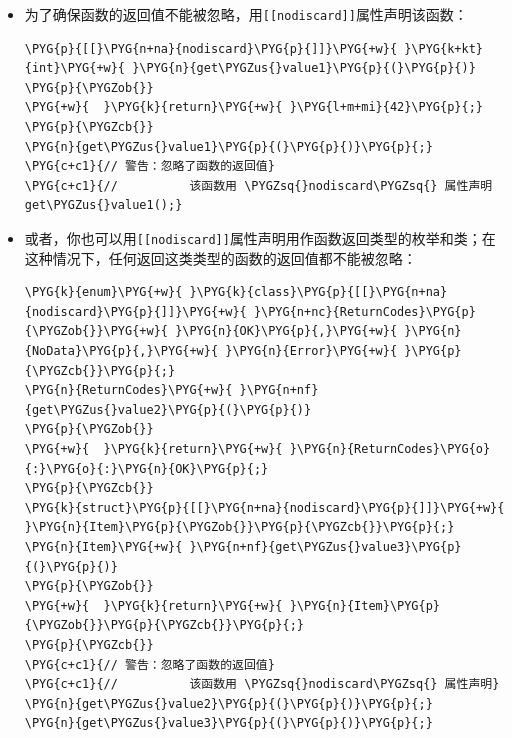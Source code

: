 \begin{itemize}
\item 为了确保函数的返回值不能被忽略，用\texttt{[[nodiscard]]}属性声明该函数：



\begin{codeblockbg}
\begin{Verbatim}[commandchars=\\\{\},breaklines=true,breakanywhere=true,fontsize=\codefont,xleftmargin=17bp]
\PYG{p}{[[}\PYG{n+na}{nodiscard}\PYG{p}{]]}\PYG{+w}{ }\PYG{k+kt}{int}\PYG{+w}{ }\PYG{n}{get\PYGZus{}value1}\PYG{p}{(}\PYG{p}{)}
\PYG{p}{\PYGZob{}}
\PYG{+w}{  }\PYG{k}{return}\PYG{+w}{ }\PYG{l+m+mi}{42}\PYG{p}{;}
\PYG{p}{\PYGZcb{}}
\PYG{n}{get\PYGZus{}value1}\PYG{p}{(}\PYG{p}{)}\PYG{p}{;}
\PYG{c+c1}{// 警告：忽略了函数的返回值}
\PYG{c+c1}{//          该函数用 \PYGZsq{}nodiscard\PYGZsq{} 属性声明 get\PYGZus{}value1();}
\end{Verbatim}
\end{codeblockbg}



\item 或者，你也可以用\texttt{[[nodiscard]]}属性声明用作函数返回类型的枚举和类；在这种情况下，任何返回这类类型的函数的返回值都不能被忽略：



\begin{codeblockbg}
\begin{Verbatim}[commandchars=\\\{\},breaklines=true,breakanywhere=true,fontsize=\codefont,xleftmargin=17bp]
\PYG{k}{enum}\PYG{+w}{ }\PYG{k}{class}\PYG{p}{[[}\PYG{n+na}{nodiscard}\PYG{p}{]]}\PYG{+w}{ }\PYG{n+nc}{ReturnCodes}\PYG{p}{\PYGZob{}}\PYG{+w}{ }\PYG{n}{OK}\PYG{p}{,}\PYG{+w}{ }\PYG{n}{NoData}\PYG{p}{,}\PYG{+w}{ }\PYG{n}{Error}\PYG{+w}{ }\PYG{p}{\PYGZcb{}}\PYG{p}{;}
\PYG{n}{ReturnCodes}\PYG{+w}{ }\PYG{n+nf}{get\PYGZus{}value2}\PYG{p}{(}\PYG{p}{)}
\PYG{p}{\PYGZob{}}
\PYG{+w}{  }\PYG{k}{return}\PYG{+w}{ }\PYG{n}{ReturnCodes}\PYG{o}{:}\PYG{o}{:}\PYG{n}{OK}\PYG{p}{;}
\PYG{p}{\PYGZcb{}}
\PYG{k}{struct}\PYG{p}{[[}\PYG{n+na}{nodiscard}\PYG{p}{]]}\PYG{+w}{ }\PYG{n}{Item}\PYG{p}{\PYGZob{}}\PYG{p}{\PYGZcb{}}\PYG{p}{;}
\PYG{n}{Item}\PYG{+w}{ }\PYG{n+nf}{get\PYGZus{}value3}\PYG{p}{(}\PYG{p}{)}
\PYG{p}{\PYGZob{}}
\PYG{+w}{  }\PYG{k}{return}\PYG{+w}{ }\PYG{n}{Item}\PYG{p}{\PYGZob{}}\PYG{p}{\PYGZcb{}}\PYG{p}{;}
\PYG{p}{\PYGZcb{}}
\PYG{c+c1}{// 警告：忽略了函数的返回值}
\PYG{c+c1}{//          该函数用 \PYGZsq{}nodiscard\PYGZsq{} 属性声明}
\PYG{n}{get\PYGZus{}value2}\PYG{p}{(}\PYG{p}{)}\PYG{p}{;}
\PYG{n}{get\PYGZus{}value3}\PYG{p}{(}\PYG{p}{)}\PYG{p}{;}
\end{Verbatim}
\end{codeblockbg}



\end{itemize}
